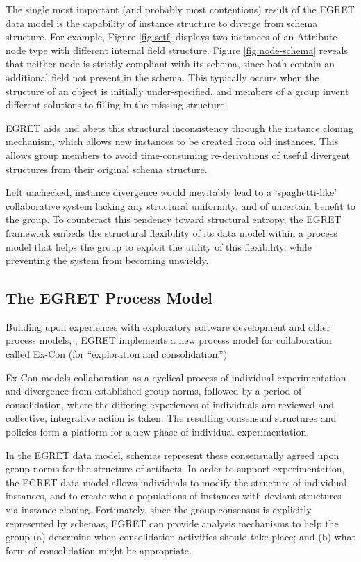 The single most important (and probably most contentious) result of the EGRET data model is the capability of instance structure to diverge from schema structure.  For example, Figure \ref{fig:setf} displays two instances of an Attribute node type with different internal field structure.  Figure \ref{fig:node-schema} reveals that neither node is strictly compliant with its schema, since both contain an additional field not present in the schema.  This typically occurs when the structure of an object is initially under-specified, and members of a group invent different solutions to filling in the missing structure.

EGRET aids and abets this structural inconsistency through the instance cloning mechanism, which allows new instances to be created from old instances. This allows group members to avoid time-consuming re-derivations of useful divergent structures from their original schema structure.

Left unchecked, instance divergence would inevitably lead to a `spaghetti-like' collaborative system lacking any structural uniformity, and of uncertain benefit to the group.  To counteract this tendency toward structural entropy, the EGRET framework embeds the structural flexibility of its data model within a process model that helps the group to exploit the utility of this flexibility, while preventing the system from becoming unwieldy.

\subsection{The EGRET Process Model}

Building upon experiences with exploratory software development and other process models, \cite{Sheil84,Partridge86,Boehm88,Balzer91}, EGRET implements a new process model for collaboration called Ex-Con (for ``exploration and consolidation.'')

Ex-Con models collaboration as a cyclical process of individual experimentation and divergence from established group norms, followed by a period of consolidation, where the differing experiences of individuals are reviewed and collective, integrative action is taken.  The resulting consensual structures and policies form a platform for a new phase of individual experimentation.

In the EGRET data model, schemas represent these consensually agreed upon group norms for the structure of artifacts.  In order to support experimentation, the EGRET data model allows individuals to modify the structure of individual instances, and to create whole populations of instances with deviant structures via instance cloning.  Fortunately, since the group consensus is explicitly represented by schemas, EGRET can provide analysis mechanisms to help the group (a) determine when consolidation activities should take place; and (b) what form of consolidation might be appropriate.

